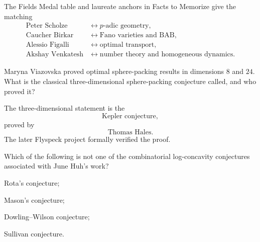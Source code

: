     \begin{solution}
        The Fields Medal table and laureate anchors in Facts to Memorize give the
        matching
        \[
            \boxed{
                \begin{aligned}
                    \text{Peter Scholze}
                    &\longleftrightarrow p\text{-adic geometry},\\
                    \text{Caucher Birkar}
                    &\longleftrightarrow \text{Fano varieties and BAB},\\
                    \text{Alessio Figalli}
                    &\longleftrightarrow \text{optimal transport},\\
                    \text{Akshay Venkatesh}
                    &\longleftrightarrow
                    \text{number theory and homogeneous dynamics}.
                \end{aligned}
            }
        \]
    \end{solution}

    \begin{expectedproblem}
        Maryna Viazovska proved optimal sphere-packing results in dimensions
        $8$ and $24$. What is the classical three-dimensional sphere-packing
        conjecture called, and who proved it?
    \end{expectedproblem}

    \begin{solution}
        The three-dimensional statement is the
        \[
            \boxed{\text{Kepler conjecture}},
        \]
        proved by
        \[
            \boxed{\text{Thomas Hales}}.
        \]
        The later Flyspeck project formally verified the proof.
    \end{solution}

    \begin{expectedproblem}
        Which of the following is not one of the combinatorial log-concavity
        conjectures associated with June Huh's work?
        \begin{problemchoices}
            \item Rota's conjecture;
            \item Mason's conjecture;
            \item Dowling--Wilson conjecture;
            \item Sullivan conjecture.
        \end{problemchoices}
    \end{expectedproblem}


